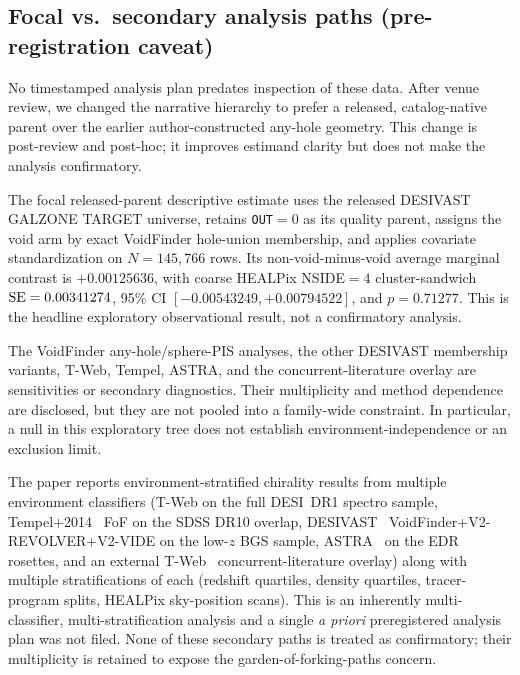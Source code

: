 \documentclass[aps,prd,twocolumn,superscriptaddress,showpacs,preprintnumbers,nofootinbib,longbibliography,floatfix]{revtex4-2}
\begin{document}
\subsection{Focal vs.\ secondary analysis paths (pre-registration
caveat)}\label{sec:primary_path}

No timestamped analysis plan predates inspection of these data. After
venue review, we changed the narrative hierarchy to prefer a released,
catalog-native parent over the earlier author-constructed any-hole
geometry. This change is post-review and post-hoc; it improves estimand
clarity but does not make the analysis confirmatory.

The focal released-parent descriptive estimate uses the released DESIVAST
GALZONE TARGET universe, retains \texttt{OUT}$=0$ as its quality parent,
assigns the void arm by exact VoidFinder hole-union membership, and applies
covariate standardization
on $N=145{,}766$ rows. Its non-void-minus-void average marginal contrast
is $+0.00125636$, with coarse HEALPix NSIDE$=4$ cluster-sandwich
${\rm SE}=0.00341274$, 95\% CI $[-0.00543249,+0.00794522]$, and
$p=0.71277$. This is the headline exploratory observational result, not a
confirmatory analysis.

The VoidFinder any-hole/sphere-PIS analyses, the other DESIVAST
membership variants, T-Web, Tempel, ASTRA, and the concurrent-literature
overlay are sensitivities or secondary diagnostics. Their multiplicity
and method dependence are disclosed, but they are not pooled into a
family-wide constraint. In particular, a null in this exploratory tree
does not establish environment-independence or an exclusion limit.

\iffalse
The paper reports environment-stratified chirality results from
multiple environment classifiers (T-Web on the full DESI~DR1 spectro
sample, Tempel+2014~\cite{Tempel2014} FoF on the SDSS DR10 overlap,
DESIVAST~\cite{DESIVAST2025} VoidFinder+V2-REVOLVER+V2-VIDE on the
low-$z$ BGS sample, ASTRA~\cite{ASTRADESI2026} on the EDR rosettes,
and an external T-Web~\cite{TWebDESI2026} concurrent-literature
overlay) along with multiple stratifications of each
(redshift quartiles, density quartiles, tracer-program splits,
HEALPix sky-position scans). This is an inherently multi-classifier,
multi-stratification analysis and a single \emph{a priori} preregistered
analysis plan was not filed. None of these secondary paths is treated as
confirmatory; their multiplicity is retained to expose the
garden-of-forking-paths concern.
\end{document}

